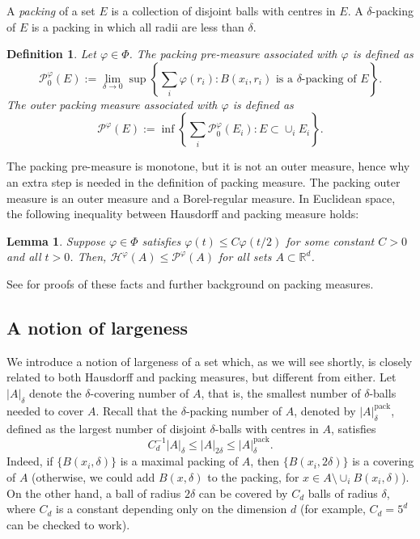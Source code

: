 \documentclass[12pt]{amsart}
\renewcommand{\phi}{\varphi}
\newtheorem{definition}[theorem]{Definition}
\newtheorem{lemma}[theorem]{Lemma}
\def\R{{\mathbb{R}}}
\numberwithin{theorem}{section}
\numberwithin{equation}{section}
\begin{document}
A \emph{packing} of a set $E$ is a collection of disjoint balls with centres in $E$. A $\delta$-packing of $E$ is a packing in which all radii are less than $\delta$.
\begin{definition}
    Let $\phi\in \Phi$. The \emph{packing pre-measure} associated with $\phi$ is defined as
    \[
        \mathcal{P}_0^\phi(E):=\lim_{\delta\to 0} \sup \left\{\sum_i \phi(r_i): B(x_i,r_i) \text{ is a $\delta$-packing of $E$} \right\}.
    \]
    The outer \emph{packing measure} associated with $\phi$ is defined as
    \[
        \mathcal{P}^\phi(E):=\inf \left\{ \sum_i \mathcal{P}_0^\phi(E_i): E\subset \cup_i E_i \right\}.
    \]
\end{definition}
The packing pre-measure is monotone, but it is not an outer measure, hence why an extra step is needed in the definition of packing measure. The packing outer measure is an outer measure and a Borel-regular measure. In Euclidean space, the following inequality between Hausdorff and packing measure holds:
\begin{lemma}
    Suppose $\phi\in \Phi$ satisfies $\phi(t) \le C \phi(t/2)$ for some constant $C>0$ and all $t>0$. Then, $\mathcal{H}^\phi(A)\le \mathcal{P}^\phi(A)$ for all sets $A\subset\R^d$.
\end{lemma}
See \cite{Cutler95} for proofs of these facts and further background on packing measures.

\subsection{A notion of largeness}

We introduce a notion of largeness of a set which, as we will see shortly, is closely related to both Hausdorff and packing measures, but different from either. Let $|A|_{\delta}$ denote the $\delta$-covering number of $A$, that is, the smallest number of $\delta$-balls needed to cover $A$. Recall that the $\delta$-packing number of $A$, denoted by $|A|_{\delta}^{\text{pack}}$, defined as the largest number of disjoint $\delta$-balls with centres in $A$, satisfies
\begin{equation} \label{eq:packing-covering}
      C_d^{-1} |A|_{\delta} \le |A|_{2\delta} \le |A|_{\delta}^{\text{pack}} .
\end{equation}
Indeed, if $\{ B(x_i,\delta) \}$ is a maximal packing of $A$, then $\{ B(x_i,2\delta)\}$ is a covering of $A$ (otherwise, we could add $B(x,\delta)$ to the packing, for $x\in A\setminus \cup_i B(x_i,\delta)$). On the other hand, a ball of radius $2\delta$ can be covered by $C_d$ balls of radius $\delta$, where $C_d$ is a constant depending only on the dimension $d$ (for example, $C_d=5^d$ can be checked to work).
\end{document}
